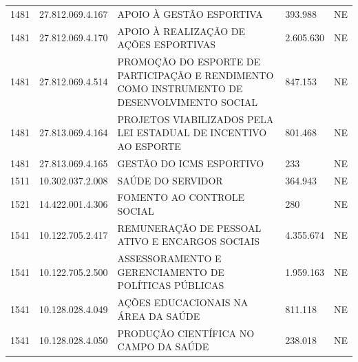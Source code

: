 \documentclass{article}
\begin{document}
\begin{longtable}[c]{m{1cm}|m{2cm}|m{10cm}|m{2cm}|m{1cm}}
\multicolumn{1}{C{1cm}|}{1481} & \multicolumn{1}{C{2cm}|}{27.812.069.4.167} & \multicolumn{1}{L{10cm}|}{APOIO À GESTÃO ESPORTIVA} & \multicolumn{1}{R{2cm}|}{393.988} & \multicolumn{1}{C{1cm}}{NE} \\
\multicolumn{1}{C{1cm}|}{1481} & \multicolumn{1}{C{2cm}|}{27.812.069.4.170} & \multicolumn{1}{L{10cm}|}{APOIO À REALIZAÇÃO DE AÇÕES ESPORTIVAS} & \multicolumn{1}{R{2cm}|}{2.605.630} & \multicolumn{1}{C{1cm}}{NE} \\
\multicolumn{1}{C{1cm}|}{1481} & \multicolumn{1}{C{2cm}|}{27.812.069.4.514} & \multicolumn{1}{L{10cm}|}{PROMOÇÃO DO ESPORTE DE PARTICIPAÇÃO E RENDIMENTO COMO INSTRUMENTO DE DESENVOLVIMENTO SOCIAL} & \multicolumn{1}{R{2cm}|}{847.153} & \multicolumn{1}{C{1cm}}{NE} \\
\multicolumn{1}{C{1cm}|}{1481} & \multicolumn{1}{C{2cm}|}{27.813.069.4.164} & \multicolumn{1}{L{10cm}|}{PROJETOS VIABILIZADOS PELA LEI ESTADUAL DE INCENTIVO AO ESPORTE} & \multicolumn{1}{R{2cm}|}{801.468} & \multicolumn{1}{C{1cm}}{NE} \\
\multicolumn{1}{C{1cm}|}{1481} & \multicolumn{1}{C{2cm}|}{27.813.069.4.165} & \multicolumn{1}{L{10cm}|}{GESTÃO DO ICMS ESPORTIVO} & \multicolumn{1}{R{2cm}|}{233} & \multicolumn{1}{C{1cm}}{NE} \\
\multicolumn{1}{C{1cm}|}{1511} & \multicolumn{1}{C{2cm}|}{10.302.037.2.008} & \multicolumn{1}{L{10cm}|}{SAÚDE DO SERVIDOR} & \multicolumn{1}{R{2cm}|}{364.943} & \multicolumn{1}{C{1cm}}{NE} \\
\multicolumn{1}{C{1cm}|}{1521} & \multicolumn{1}{C{2cm}|}{14.422.001.4.306} & \multicolumn{1}{L{10cm}|}{FOMENTO AO CONTROLE SOCIAL} & \multicolumn{1}{R{2cm}|}{280} & \multicolumn{1}{C{1cm}}{NE} \\
\multicolumn{1}{C{1cm}|}{1541} & \multicolumn{1}{C{2cm}|}{10.122.705.2.417} & \multicolumn{1}{L{10cm}|}{REMUNERAÇÃO DE PESSOAL ATIVO E ENCARGOS SOCIAIS} & \multicolumn{1}{R{2cm}|}{4.355.674} & \multicolumn{1}{C{1cm}}{NE} \\
\multicolumn{1}{C{1cm}|}{1541} & \multicolumn{1}{C{2cm}|}{10.122.705.2.500} & \multicolumn{1}{L{10cm}|}{ASSESSORAMENTO E GERENCIAMENTO DE POLÍTICAS PÚBLICAS} & \multicolumn{1}{R{2cm}|}{1.959.163} & \multicolumn{1}{C{1cm}}{NE} \\
\multicolumn{1}{C{1cm}|}{1541} & \multicolumn{1}{C{2cm}|}{10.128.028.4.049} & \multicolumn{1}{L{10cm}|}{AÇÕES EDUCACIONAIS NA ÁREA DA SAÚDE} & \multicolumn{1}{R{2cm}|}{811.118} & \multicolumn{1}{C{1cm}}{NE} \\
\multicolumn{1}{C{1cm}|}{1541} & \multicolumn{1}{C{2cm}|}{10.128.028.4.050} & \multicolumn{1}{L{10cm}|}{PRODUÇÃO CIENTÍFICA NO CAMPO DA SAÚDE} & \multicolumn{1}{R{2cm}|}{238.018} & \multicolumn{1}{C{1cm}}{NE} \\

\end{longtable}
\end{document}
